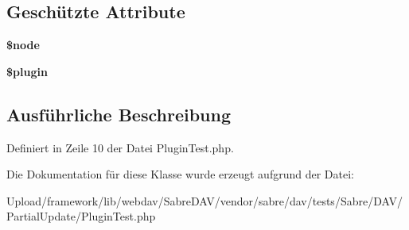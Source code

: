 \subsection*{Geschützte Attribute}
\begin{DoxyCompactItemize}
\item 
\mbox{\label{class_sabre_1_1_d_a_v_1_1_partial_update_1_1_plugin_test_ac1f4821a151ac127e66d842a2a74f5fa}} 
{\bfseries \$node}
\item 
\mbox{\label{class_sabre_1_1_d_a_v_1_1_partial_update_1_1_plugin_test_a7eb27e173e1d49b1c1681a412bd35f47}} 
{\bfseries \$plugin}
\end{DoxyCompactItemize}


\subsection{Ausführliche Beschreibung}


Definiert in Zeile 10 der Datei Plugin\+Test.\+php.



Die Dokumentation für diese Klasse wurde erzeugt aufgrund der Datei\+:\begin{DoxyCompactItemize}
\item 
Upload/framework/lib/webdav/\+Sabre\+D\+A\+V/vendor/sabre/dav/tests/\+Sabre/\+D\+A\+V/\+Partial\+Update/Plugin\+Test.\+php\end{DoxyCompactItemize}
